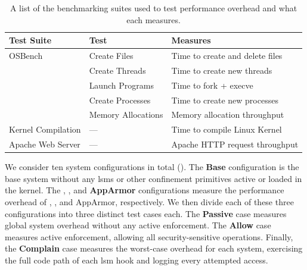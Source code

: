 \begin{table}[htpb]
  \centering
  \caption[List of benchmarking suites and what they measure]{
    A list of the benchmarking suites used to test performance overhead and what each
    measures.
  }%
  \label{tab:suites}
  \begin{tabular}{llp{3in}}
  \toprule
  Test Suite & Test & Measures \\
  \midrule
  OSBench                    & Create Files       & Time to create and delete files \\
                             & Create Threads     & Time to create new threads \\
                             & Launch Programs    & Time to fork + execve \\
                             & Create Processes   & Time to create new processes \\
                             & Memory Allocations & Memory allocation throughput \\
  Kernel Compilation         & ---                & Time to compile Linux Kernel \\
  Apache Web Server          & ---                & Apache HTTP request throughput \\
  \bottomrule
  \end{tabular}
\end{table}

We consider ten system configurations in total (). The
\textbf{Base} configuration is the base system without any \glspl{lsm} or other
confinement primitives active or loaded in the kernel. The \textbf{\bpfbox},
\textbf{\bpfcontain}, and \textbf{AppArmor} configurations measure the performance
overhead of \bpfbox{}, \bpfcontain{}, and AppArmor, respectively. We then divide each of
these three configurations into three distinct test cases each. The \textbf{Passive} case
measures global system overhead without any active enforcement. The \textbf{Allow} case
measures active enforcement, allowing all security-sensitive operations. Finally, the
\textbf{Complain} case measures the worst-case overhead for each system, exercising the
full code path of each \gls{lsm} hook and logging every attempted access.

